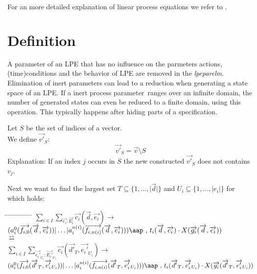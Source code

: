 \documentclass[a4paper,10pt]{article}
\theoremstyle{plain}
\theoremstyle{definition}
\newcommand{\lpe}{linear process equation}
\newcommand{\tool}{\textit{lpeparelm}}
\newcommand{\ovr}{\overrightarrow}
\newcommand{\pp}{process parameter}
\newcommand{\bisim}{\frac{\leftrightarrow}{}}
\newcommand{\tab}{\hspace*{5.mm} \= \hspace*{5.mm} \= \hspace*{5.mm} \= \hspace*{5.mm} \= \hspace*{5.mm} \= \hspace*{5.mm}  \= \hspace*{5.mm}  \= \hspace*{5.mm}  \= \hspace*{5.mm} \= \hspace*{5.mm} \= \hspace*{5.mm}  \= \hspace*{5.mm}  \= \hspace*{5.mm}\kill}
\newcommand{\at}[1]{\mbox{\aap ,} #1}
\begin{document}
For an more detailed explanation of \lpe s  we refer to \cite{LPE_info}.

\section{Definition}
A parameter of an LPE that has no influence on the parmeters actions, (time)conditions and the behavior of LPE are removed in the \tool . Elimination of  inert parameters can lead to a reduction when generating a state space of an LPE. If a inert \pp\ ranges over an infinite domain, the number of generated states can even be reduced to a finite domain, using this operation. This typically happens after hiding parts of a specification.


\begin{defn} Let $S$ be the set of indices of a vector.\\ 
We define $\ovr{v'}_S$:\\
$$\ovr{v'}_S = \ovr{v} \setminus S$$
Explanation: If an index $j$ occurs in $S$ the new constructed $\ovr{v'}_S$ does not contains $v_j$.
\end{defn}

Next we want to find the largest set $T \subseteq \lbrace 1, \ldots , \vert \ovr{d} \vert \rbrace$  and $U_i \subseteq \lbrace 1, \ldots, \vert {e_i} \vert \rbrace$ for which holds:

\begin{tabbing}
\tab
\> $\sum_{i \in I} \sum_{\ovr{e_i}:\ovr{E_i}} \ovr{c_i} ( \ovr{d}, \ovr{e_i} ) \rightarrow $\\
\> \> \> $(a_i^0 (\ovr{f_{i,0}}(\ovr{d},\ovr{e_i})) \vert \ldots \vert a_i^{n(i)}(\ovr{f_{i,n(i)}}(\ovr{d},\ovr{e_i}))) \at \text{ } t_i(\ovr{d},\ovr{e_i})  \cdot X(\ovr{g_i}(\ovr{d},\ovr{e_i})) 
$ \\
$\bisim$ \\
\> $\sum_{i \in I} \sum_{\ovr{e_i'}_{U_i}:\ovr{E_i'}_{U_i}} \ovr{c_i} ( \ovr{d'}_T, \ovr{e_i'}_{U_i} ) \rightarrow $\\
\> \> \> 
$(a_i^0 (\ovr{f_{i,0}}(\ovr{d'}_T,\ovr{e_i'}_{U_i})) \vert \ldots \vert a_i^{n(i)}(\ovr{f_{i,n(i)}}(\ovr{d'}_T,\ovr{e_i'}_{U_i}))) \at \text{ } t_i(\ovr{d'}_T,\ovr{e_i'}_{U_i})  \cdot X(\ovr{g_i}(\ovr{d'}_T,\ovr{e_i'}_{U_i})) 
$ \\
\end{tabbing}
\end{document}
